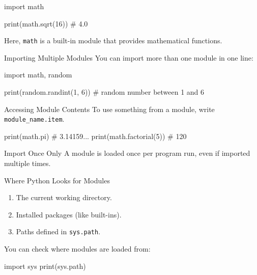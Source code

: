 \documentclass[
  letterpaper,
  DIV=11,
  numbers=noendperiod]{scrreprt}
\newenvironment{Shaded}{\begin{snugshade}}{\end{snugshade}}
\newcommand{\BuiltInTok}[1]{\textcolor[rgb]{0.00,0.23,0.31}{#1}}
\newcommand{\CommentTok}[1]{\textcolor[rgb]{0.37,0.37,0.37}{#1}}
\newcommand{\DecValTok}[1]{\textcolor[rgb]{0.68,0.00,0.00}{#1}}
\newcommand{\ImportTok}[1]{\textcolor[rgb]{0.00,0.46,0.62}{#1}}
\newcommand{\NormalTok}[1]{\textcolor[rgb]{0.00,0.23,0.31}{#1}}
\providecommand{\tightlist}{%
  \setlength{\itemsep}{0pt}\setlength{\parskip}{0pt}}
\begin{document}
\begin{Shaded}
\begin{Highlighting}[]
\ImportTok{import}\NormalTok{ math}

\BuiltInTok{print}\NormalTok{(math.sqrt(}\DecValTok{16}\NormalTok{))   }\CommentTok{\# 4.0}
\end{Highlighting}
\end{Shaded}

Here, \texttt{math} is a built-in module that provides mathematical
functions.

Importing Multiple Modules You can import more than one module in one
line:

\begin{Shaded}
\begin{Highlighting}[]
\ImportTok{import}\NormalTok{ math, random}

\BuiltInTok{print}\NormalTok{(random.randint(}\DecValTok{1}\NormalTok{, }\DecValTok{6}\NormalTok{))   }\CommentTok{\# random number between 1 and 6}
\end{Highlighting}
\end{Shaded}

Accessing Module Contents To use something from a module, write
\texttt{module\_name.item}.

\begin{Shaded}
\begin{Highlighting}[]
\BuiltInTok{print}\NormalTok{(math.pi)      }\CommentTok{\# 3.14159...}
\BuiltInTok{print}\NormalTok{(math.factorial(}\DecValTok{5}\NormalTok{))   }\CommentTok{\# 120}
\end{Highlighting}
\end{Shaded}

Import Once Only A module is loaded once per program run, even if
imported multiple times.

Where Python Looks for Modules

\begin{enumerate}
\def\labelenumi{\arabic{enumi}.}
\tightlist
\item
  The current working directory.
\item
  Installed packages (like built-ins).
\item
  Paths defined in \texttt{sys.path}.
\end{enumerate}

You can check where modules are loaded from:

\begin{Shaded}
\begin{Highlighting}[]
\ImportTok{import}\NormalTok{ sys}
\BuiltInTok{print}\NormalTok{(sys.path)}
\end{Highlighting}
\end{Shaded}
\end{document}
